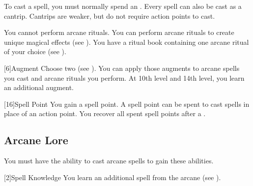             To cast a spell, you must normally spend an .
            Every spell can also be cast as a cantrip.
            Cantrips are weaker, but do not require action points to cast.

             You cannot perform arcane rituals.
             You can perform arcane rituals to create unique magical effects (see ).
            You have a ritual book containing one arcane ritual of your choice (see ).

            [6]{Augment}
            Choose two  (see ).
            You can apply those augments to arcane spells you cast and arcane rituals you perform.
            At 10th level and 14th level, you learn an additional augment.

            [16]{Spell Point}
            You gain a spell point.
            A spell point can be spent to cast spells in place of an action point.
            You recover all spent spell points after a .

        \subsection{Arcane Lore}
            You must have the ability to cast arcane spells to gain these abilities.

            [2]{Spell Knowledge} 
            You learn an additional spell from the arcane  (see ).

